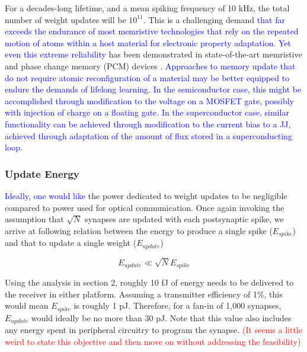 \documentclass[twocolumn]{article}
\begin{document}
For a decades-long lifetime, and a mean spiking frequency of 10 kHz, the total number of weight updates will be $10^{11}$. This is a challenging demand \textcolor{blue}{that far exceeds the endurance of most memristive technologies that rely on the repeated motion of atoms within a host material for electronic property adaptation. Yet even this extreme reliability} has been demonstrated in state-of-the-art memristive and phase change memory (PCM) devices \cite{zhao2020reliability}. \textcolor{blue}{Approaches to memory update that do not require atomic reconfiguration of a material may be better equipped to endure the demands of lifelong learning. In the semiconductor case, this might be accomplished through modification to the voltage on a MOSFET gate, possibly with injection of charge on a floating gate. In the superconductor case, similar functionality can be achieved through modification to the current bias to a JJ, achieved through adaptation of the amount of flux stored in a superconducting loop.}

\subsubsection{Update Energy}
\textcolor{blue}{Ideally, one would like} the power dedicated to weight updates to be negligible compared to power used for optical communication. Once again invoking the assumption that $\sqrt{N}$ synapses are updated with each postsynaptic spike, we arrive at following relation between the energy to produce a single spike ($E_{spike}$) and that to update a single weight ($E_{update}$)

\begin{equation}
    E_{update} \ll \sqrt{N}E_{spike}
\end{equation}

Using the analysis in section 2, roughly 10 fJ of energy needs to be delivered to the receiver in either platform. Assuming a transmitter efficiency of 1\%, this would mean $E_{spike}$ is roughly 1 pJ. Therefore, for a fan-in of 1,000 synapses, $E_{update}$ would ideally be no more than 30 pJ. Note that this value also includes any energy spent in peripheral circuitry to program the synapse. \textcolor{red}{(It seems a little weird to state this objective and then move on without addressing the feasibility)}
\end{document}
